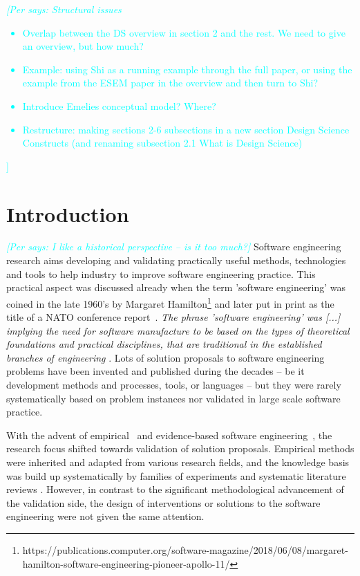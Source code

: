 \documentclass[graybox]{svmult}
\newcommand{\per}[1]{\textcolor{cyan}{{\it [Per says: #1]}}}
\newcommand{\per}[1]{}
\begin{document}
\per{Structural issues
\begin{itemize}
\item Overlap between the DS overview in section 2 and the rest. We need to give an overview, but how much?
\item Example: using Shi as a running example through the full paper, or using the example from the ESEM paper in the overview and then turn to Shi?
\item Introduce Emelies conceptual model? Where?
\item Restructure: making sections 2-6 subsections in a new section Design Science Constructs (and renaming subsection 2.1 What is Design Science)
\end{itemize}}
\section{Introduction}
\label{sec:intro}

\per{I like a historical perspective -- is it too much?}
Software engineering research aims developing and validating practically useful methods, technologies and tools to help industry to improve software engineering practice. This practical aspect was discussed already when the term 'software engineering' was coined in the late 1960's by Margaret Hamilton\footnote{https://publications.computer.org/software-magazine/2018/06/08/margaret-hamilton-software-engineering-pioneer-apollo-11/} and later put in print as the title of a NATO conference report~\cite{Nato1968}. \emph{The phrase 'software engineering' was [...] implying the need for software manufacture to be based on the types of theoretical foundations and practical disciplines, that are traditional in the established branches of engineering} \cite[p13]{Nato1968}. Lots of solution proposals to software engineering problems have been invented and published during the decades -- be it development methods and processes, tools, or languages -- but they were rarely systematically based on problem instances nor validated in large scale software practice.

With the advent of empirical~\cite{Basili86} and evidence-based software engineering~\cite{Kitchenham04}, the research focus shifted towards validation of solution proposals. Empirical methods were inherited and adapted from various research fields, and the knowledge basis was build up systematically by families of experiments \cite{Basili99} and systematic literature reviews \cite{Kitchenham15}. However, in contrast to the significant methodological advancement of the validation side, the design of interventions or solutions to the software engineering were not given the same attention. 
\end{document}
